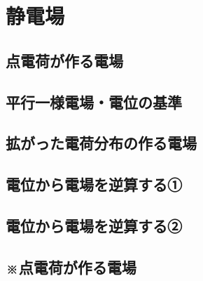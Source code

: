 \documentclass[../../../all/physics-standard_questions_all.tex]{subfiles}
\begin{document}
\section{静電場}

\subsection{点電荷が作る電場}
    

    \vspace{2cm}
    \vfill

\subsection{平行一様電場・電位の基準}
    

    \vspace{2cm}
    \vfill

\subsection{拡がった電荷分布の作る電場}
    

    \vspace{2cm}
    \vfill

\subsection{電位から電場を逆算する①}
    

    \vspace{2cm}
    \vfill

\subsection{電位から電場を逆算する②}
    
    
    \vspace{2cm}
    \vfill

\subsection{※点電荷が作る電場}
    
\end{document}
